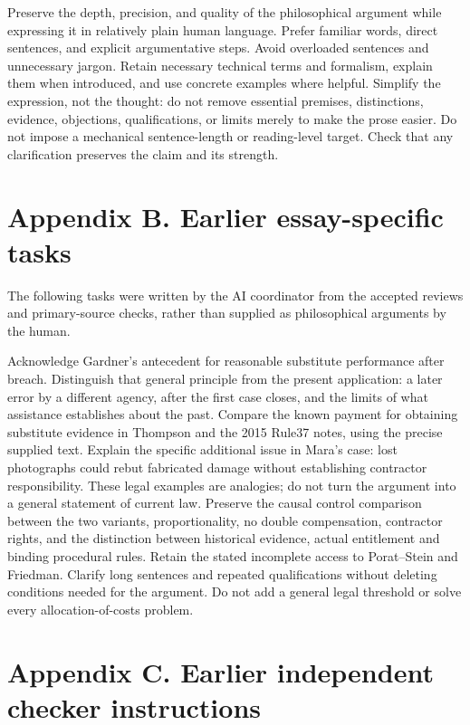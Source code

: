 Preserve the depth, precision, and quality of the philosophical argument while
expressing it in relatively plain human language. Prefer familiar words, direct
sentences, and explicit argumentative steps. Avoid overloaded sentences and
unnecessary jargon. Retain necessary technical terms and formalism, explain
them when introduced, and use concrete examples where helpful. Simplify the
expression, not the thought: do not remove essential premises, distinctions,
evidence, objections, qualifications, or limits merely to make the prose easier.
Do not impose a mechanical sentence-length or reading-level target. Check that
any clarification preserves the claim and its strength.

\section*{Appendix B. Earlier essay-specific tasks}

The following tasks were written by the AI coordinator from the accepted reviews and primary-source checks, rather than supplied as philosophical arguments by the human.

Acknowledge Gardner's antecedent for reasonable substitute performance after breach. Distinguish that general principle from the present application: a later error by a different agency, after the first case closes, and the limits of what assistance establishes about the past.
Compare the known payment for obtaining substitute evidence in Thompson and the 2015 Rule37 notes, using the precise supplied text. Explain the specific additional issue in Mara's case: lost photographs could rebut fabricated damage without establishing contractor responsibility. These legal examples are analogies; do not turn the argument into a general statement of current law.
Preserve the causal control comparison between the two variants, proportionality, no double compensation, contractor rights, and the distinction between historical evidence, actual entitlement and binding procedural rules. Retain the stated incomplete access to Porat–Stein and Friedman. Clarify long sentences and repeated qualifications without deleting conditions needed for the argument. Do not add a general legal threshold or solve every allocation-of-costs problem.

\section*{Appendix C. Earlier independent checker instructions}

